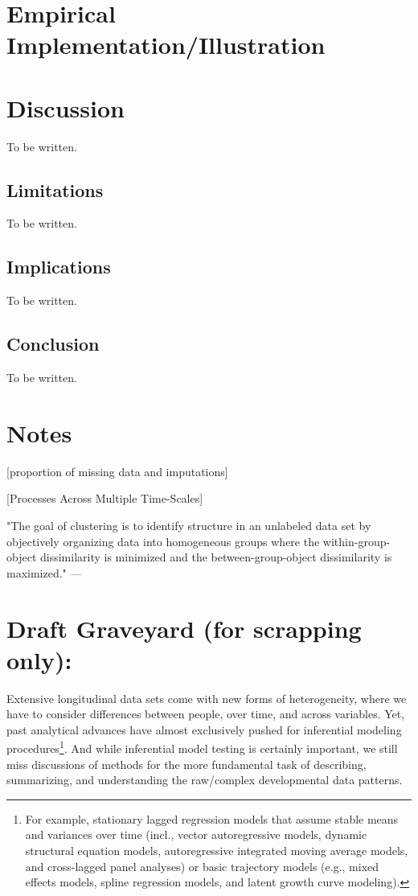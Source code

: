 \documentclass[man, 12pt, a4paper]{apa7}
\theoremstyle{break}
\theoremstyle{plain}
\begin{document}
\section{Empirical Implementation/Illustration}



\section{Discussion}
To be written.

\subsection{Limitations}
To be written.

\subsection{Implications}
To be written.


\subsection{Conclusion}
To be written.




\section{Notes}

\citep[][]{Madley-Dowd2019} [proportion of missing data and imputations]

\citep[e.g., see][]{Ram2014} [Processes Across Multiple Time-Scales]

"The goal of clustering is to identify structure in an unlabeled data set by objectively organizing data into homogeneous groups where the within-group-object dissimilarity is minimized and the between-group-object dissimilarity is maximized." --- \citep[][p.1857]{liao2005}

\section{Draft Graveyard (for scrapping only):}

Extensive longitudinal data sets come with new forms of heterogeneity, where we have to consider differences between people, over time, and across variables. Yet, past analytical advances have almost exclusively pushed for inferential modeling procedures\footnote{For example, stationary lagged regression models that assume stable means and variances over time (incl., vector autoregressive models, dynamic structural equation models, autoregressive integrated moving average models, and cross-lagged panel analyses) or basic trajectory models (e.g., mixed effects models, spline regression models, and latent growth curve modeling).}. And while inferential model testing is certainly important, we still miss discussions of methods for the more fundamental task of describing, summarizing, and understanding the raw/complex developmental data patterns.
\end{document}
